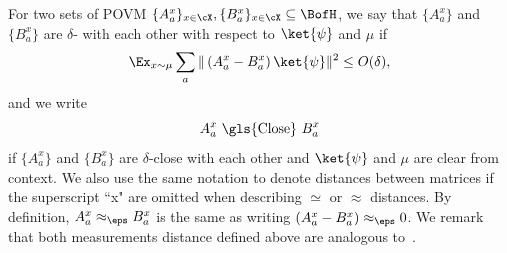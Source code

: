 For two sets of POVM $\{ A_a^x \}_{x \in \cX}, \{ B_a^x \}_{x \in \cX} \subseteq \BofH$, we say that $\{ A_a^x \}$ and $\{ B_a^x \}$ are $\delta$- with each other with respect to $\ket{\psi}$ and $\mu$ if
\begin{equation} \label{eq:Closedef}
	\Ex_{x \sim \mu} \sum_{a} \| \left(A_a^x -  B_a^x\right) \ket{\psi}\|^2 \leq O(\delta),
\end{equation}
and we write
\begin{equation*}
	A_a^x \text{ \gls{Close} }  B_a^x
\end{equation*}
if $\{ A_a^x \}$ and $\{ B_a^x \}$ are $\delta$-close with each other and $\ket{\psi}$ and $\mu$ are clear from context. We also use the same notation to denote distances between matrices if the superscript ``x" are omitted when describing $\simeq$ or $\approx$ distances. By definition, $A_a^x  \approx_{\eps} B_a^x $ is the same as writing $\left(A_a^x - B_a^x \right) \approx_{\eps} 0$. We remark that both measurements distance defined above are analogous to~\cite[Definition 5.15, 5.16]{jiMIPRE2022a}.

